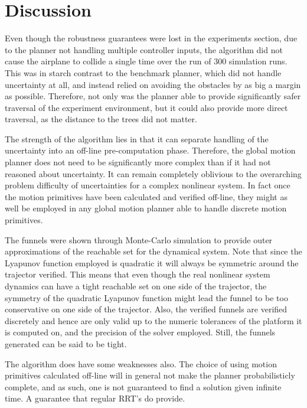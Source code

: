 \chapter{Discussion}
\label{chp:discussion}

Even though the robustness guarantees were lost in the experiments section, due
to the planner not handling multiple controller inputs, the \rrtfunnel{}
algorithm did not cause the airplane to collide a single time over the run of
\(300\) simulation runs. This was in starch contrast to the benchmark planner,
which did not handle uncertainty at all, and instead relied on avoiding the
obstacles by as big a margin as possible. Therefore, not only was the
\rrtfunnel{} planner able to provide significantly safer traversal of the
experiment environment, but it could also provide more direct traversal, as the
distance to the trees did not matter.

The strength of the algorithm lies in that it can separate handling of the
uncertainty into an off-line pre-computation phase. Therefore, the global motion
planner does not need to be significantly more complex than if it had not
reasoned about uncertainty. It can remain completely oblivious to
the overarching problem difficulty of uncertainties for a complex nonlinear
system. In fact once the motion primitives have been calculated and verified
off-line, they might as well be employed in any global motion planner able to
handle discrete motion primitives.

The funnels were shown through Monte-Carlo simulation to provide outer
approximations of the reachable set for the dynamical system. Note that since
the Lyapunov function employed is quadratic it will always be symmetric around
the trajector verified. This means that even though the real nonlinear system
dynamics can have a tight reachable set on one side of the trajector, the
symmetry of the quadratic Lyapunov function might lead the funnel to be too
conservative on one side of the trajector. Also, the verified funnels are
verified discretely and hence are only valid up to the numeric tolerances of the
platform it is computed on, and the precision of the solver employed. Still, the
funnels generated can be said to be tight.

The algorithm does have some weaknesses also. The choice of using motion
primitives calculated off-line will in general not make the planner
probabilisticly complete, and as such, one is not guaranteed to find a solution
given infinite time. A guarantee that regular \ac{RRT}'s do provide.

